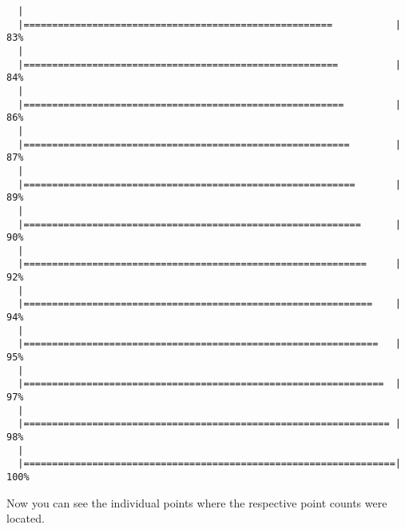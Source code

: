 \documentclass[]{book}
\newenvironment{Shaded}{\begin{snugshade}}{\end{snugshade}}
\newcommand{\CommentTok}[1]{\textcolor[rgb]{0.56,0.35,0.01}{\textit{#1}}}
\begin{document}
\begin{verbatim}
  |                                                                       
  |======================================================           |  83%
  |                                                                       
  |=======================================================          |  84%
  |                                                                       
  |========================================================         |  86%
  |                                                                       
  |=========================================================        |  87%
  |                                                                       
  |==========================================================       |  89%
  |                                                                       
  |===========================================================      |  90%
  |                                                                       
  |============================================================     |  92%
  |                                                                       
  |=============================================================    |  94%
  |                                                                       
  |==============================================================   |  95%
  |                                                                       
  |===============================================================  |  97%
  |                                                                       
  |================================================================ |  98%
  |                                                                       
  |=================================================================| 100%
\end{verbatim}

\begin{Shaded}
\end{Shaded}

Now you can see the individual points where the respective point counts were
located.
\end{document}
